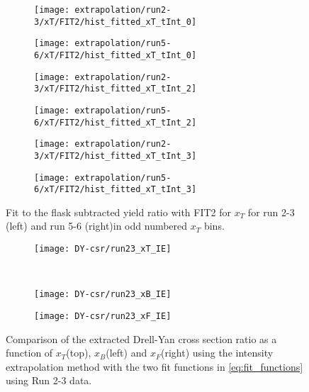 \documentclass[../main.tex]{subfiles}
\begin{document}
\begin{figure}[h!]
	\centering
	\begin{subfigure}{0.45\linewidth}
		\texttt{[image: extrapolation/run2-3/xT/FIT2/hist\_fitted\_xT\_tInt\_0]}
	\end{subfigure}
	\begin{subfigure}{0.45\linewidth}
		\texttt{[image: extrapolation/run5-6/xT/FIT2/hist\_fitted\_xT\_tInt\_0]}
	\end{subfigure}
	\begin{subfigure}{0.45\linewidth}
		\texttt{[image: extrapolation/run2-3/xT/FIT2/hist\_fitted\_xT\_tInt\_2]}
	\end{subfigure}
	\begin{subfigure}{0.45\linewidth}
		\texttt{[image: extrapolation/run5-6/xT/FIT2/hist\_fitted\_xT\_tInt\_2]}
	\end{subfigure}
	\begin{subfigure}{0.45\linewidth}
		\texttt{[image: extrapolation/run2-3/xT/FIT2/hist\_fitted\_xT\_tInt\_3]}
	\end{subfigure}
	\begin{subfigure}{0.45\linewidth}
		\texttt{[image: extrapolation/run5-6/xT/FIT2/hist\_fitted\_xT\_tInt\_3]}
	\end{subfigure}
	\caption{Fit to the flask subtracted yield ratio with FIT2 for $x_T$ for run 2-3 (left) and run 5-6 (right)in odd numbered $x_T$ bins.}
	\label{fig:FIT2_selected}
\end{figure}

\begin{figure}[h!]
	\centering
	\begin{subfigure}{0.6\linewidth}
		\texttt{[image: DY-csr/run23\_xT\_IE]}
	\end{subfigure}\\
	\begin{subfigure}{0.45\linewidth}
		\texttt{[image: DY-csr/run23\_xB\_IE]}
	\end{subfigure}
	\begin{subfigure}{0.45\linewidth}
		\texttt{[image: DY-csr/run23\_xF\_IE]}
	\end{subfigure}
	\caption{Comparison of the extracted Drell-Yan cross section ratio as a function of $x_T$(top),
		$x_B$(left) and $x_F$(right) using the intensity extrapolation method with the two fit functions in \cref{eq:fit_functions}
		using Run 2-3 data.}
	\label{fig:CSR_IE_run23}
\end{figure}
\end{document}
